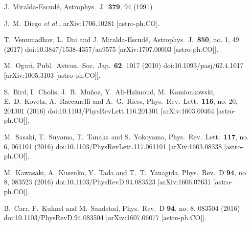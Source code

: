 \documentclass[showpacs,twocolumn,preprintnumbers,amsmath,amssymb,superscriptaddress,nofootinbib]{revtex4}
\begin{document}
\begin{thebibliography}{0}
  J.~Miralda-Escud\'{e},
  Astrophys.\ J.\  {\bf 379}, 94 (1991)

  J.~M.~Diego {\it et al.},
  arXiv:1706.10281 [astro-ph.CO].

  T.~Venumadhav, L.~Dai and J.~Miralda-Escudé,
  Astrophys.\ J.\  {\bf 850}, no. 1, 49 (2017)
  doi:10.3847/1538-4357/aa9575
  [arXiv:1707.00003 [astro-ph.CO]].
  
  M.~Oguri,
  Publ.\ Astron.\ Soc.\ Jap.\  {\bf 62}, 1017 (2010)
  doi:10.1093/pasj/62.4.1017
  [arXiv:1005.3103 [astro-ph.CO]].

  S.~Bird, I.~Cholis, J.~B.~Mu\~{n}oz, Y.~Ali-Ha\"{i}moud, M.~Kamionkowski, E.~D.~Kovetz, A.~Raccanelli and A.~G.~Riess,
  Phys.\ Rev.\ Lett.\  {\bf 116}, no. 20, 201301 (2016)
  doi:10.1103/PhysRevLett.116.201301
  [arXiv:1603.00464 [astro-ph.CO]].

  M.~Sasaki, T.~Suyama, T.~Tanaka and S.~Yokoyama,
  Phys.\ Rev.\ Lett.\  {\bf 117}, no. 6, 061101 (2016)
  doi:10.1103/PhysRevLett.117.061101
  [arXiv:1603.08338 [astro-ph.CO]].

  M.~Kawasaki, A.~Kusenko, Y.~Tada and T.~T.~Yanagida,
  Phys.\ Rev.\ D {\bf 94}, no. 8, 083523 (2016)
  doi:10.1103/PhysRevD.94.083523
  [arXiv:1606.07631 [astro-ph.CO]].

  B.~Carr, F.~Kuhnel and M.~Sandstad,
  Phys.\ Rev.\ D {\bf 94}, no. 8, 083504 (2016)
  doi:10.1103/PhysRevD.94.083504
  [arXiv:1607.06077 [astro-ph.CO]].


\end{thebibliography}
\end{document}
